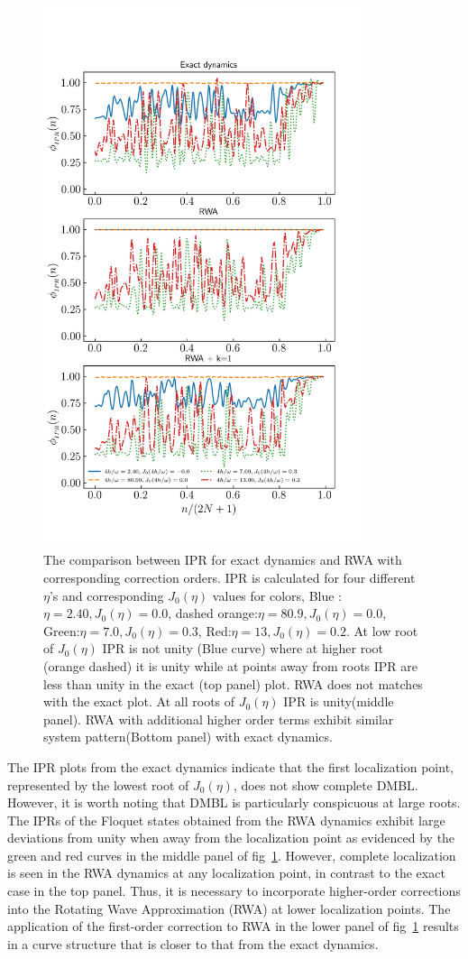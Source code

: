 \documentclass[%
reprint,
superscriptaddress,
amsmath,amssymb,
aps,
prb,
showkeys,
]{revtex4-2}
\begin{document}
	\begin{figure}[t!]
		\centering
		\includegraphics[width =9.5cm]{comprasion_LMG_50_highFr90_exact_nd_rwa.jpeg}
		\caption{The comparison between IPR for exact dynamics and RWA with corresponding correction orders. IPR is calculated for four different $\eta$'s and corresponding $J_0(\eta)$ values for colors, Blue :$\eta = 2.40, J_0(\eta) = 0.0$, dashed orange:$\eta = 80.9, J_0(\eta) = 0.0$, Green:$\eta =7.0, J_0(\eta) = 0.3$, Red:$\eta = 13, J_0(\eta)= 0.2$. At low root of $J_0(\eta)$ IPR is not unity (Blue curve) where at higher root (orange dashed) it is unity while at points away from roots IPR are less than unity in the exact (top panel) plot. RWA does not matches with the exact plot. At all roots of $J_0(\eta)$ IPR is unity(middle panel). RWA with additional higher order terms exhibit similar system pattern(Bottom panel) with exact dynamics.}
		\label{fig:lmg_ipr_rwa11}
	\end{figure}
The IPR plots from the exact dynamics indicate that the first localization point, represented by the lowest  root of $J_0(\eta)$, does not show complete DMBL. However, it is worth noting that DMBL is particularly conspicuous at large roots. The IPRs of the Floquet states obtained from the RWA dynamics exhibit large deviations from unity when away from the localization point as evidenced by the green and red curves in the middle panel of fig~\ref{fig:lmg_ipr_rwa11}. However, complete localization is seen in the RWA dynamics at any localization point, in contrast to the exact case in the top panel. Thus, it is necessary to incorporate  higher-order corrections into the Rotating Wave Approximation (RWA) at lower localization points. The application of the first-order correction to RWA in the lower panel of fig~\ref{fig:lmg_ipr_rwa11} results in a curve structure that is closer to that from the exact dynamics.
	
\end{document}
